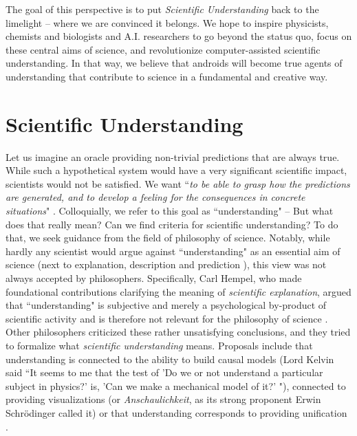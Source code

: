 The goal of this perspective is to put \textit{Scientific Understanding} back to the limelight -- where we are convinced it belongs. We hope to inspire physicists, chemists and biologists and A.I. researchers to go beyond the status quo, focus on these central aims of science, and revolutionize computer-assisted scientific understanding. In that way, we believe that androids will become true agents of understanding that contribute to science in a fundamental and creative way.




\section{Scientific Understanding}
Let us imagine an oracle providing non-trivial predictions that are always true. While such a hypothetical system would have a very significant scientific impact, scientists would not be satisfied. We want ``\textit{to be able to grasp how the predictions are generated, and to develop a feeling for the consequences in concrete situations}" \cite{de2005contextual}. Colloquially, we refer to this goal as ``understanding" -- But what does that really mean? Can we find criteria for scientific understanding? To do that, we seek guidance from the field of philosophy of science. Notably, while hardly any scientist would argue against ``understanding" as an essential aim of science (next to explanation, description and prediction \cite{de2020understanding}), this view was not always accepted by philosophers. Specifically, Carl Hempel, who made foundational contributions clarifying the meaning of \textit{scientific explanation}, argued that ``understanding" is subjective and merely a psychological by-product of scientific activity and is therefore not relevant for the philosophy of science \cite{hempel1965aspects}. Other philosophers criticized these rather unsatisfying conclusions, and they tried to formalize what \textit{scientific understanding} means. Proposals include that understanding is connected to the ability to build causal models (Lord Kelvin said ``It seems to me that the test of 'Do we or not understand a particular subject in physics?' is, 'Can we make a mechanical model of it?' "\cite{de2005contextual}), connected to providing visualizations (or \textit{Anschaulichkeit}, as its strong proponent Erwin Schr\"odinger called it\cite{schrodinger1996nature,de2014visualization}) or that understanding corresponds to providing unification \cite{friedman1974explanation, kitcher1981explanatory}.

